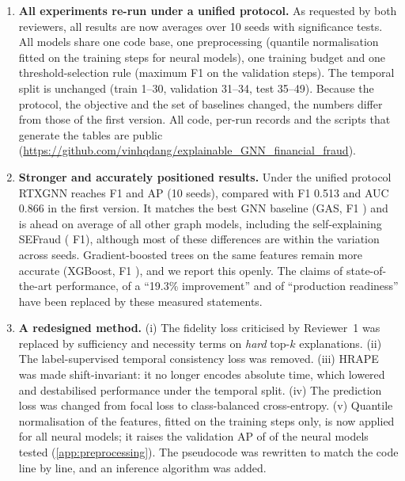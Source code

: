 \documentclass[11pt]{article}
\begin{document}
\begin{enumerate}[leftmargin=*]
\item \textbf{All experiments re-run under a unified protocol.} As requested by both reviewers, all results are now averages over 10 seeds with significance tests. All models share one code base, one preprocessing (quantile normalisation fitted on the training steps for neural models), one training budget and one threshold-selection rule (maximum F1 on the validation steps). The temporal split is unchanged (train 1--30, validation 31--34, test 35--49). Because the protocol, the objective and the set of baselines changed, the numbers differ from those of the first version. All code, per-run records and the scripts that generate the tables are public (\url{https://github.com/vinhqdang/explainable_GNN_financial_fraud}).
\item \textbf{Stronger and accurately positioned results.} Under the unified protocol RTXGNN reaches F1 \rtxFone{} and AP \rtxAP{} (10 seeds), compared with F1 0.513 and AUC 0.866 in the first version. It matches the best GNN baseline (GAS, F1 \gasFone) and is ahead on average of all other graph models, including the self-explaining SEFraud (\deltaFOnesefraud{} F1), although most of these differences are within the variation across seeds. Gradient-boosted trees on the same features remain more accurate (XGBoost, F1 \xgbFone), and we report this openly. The claims of state-of-the-art performance, of a ``19.3\% improvement'' and of ``production readiness'' have been replaced by these measured statements.
\item \textbf{A redesigned method.} (i) The fidelity loss criticised by Reviewer~1 was replaced by sufficiency and necessity terms on \emph{hard} top-$k$ explanations. (ii) The label-supervised temporal consistency loss was removed. (iii) HRAPE was made shift-invariant: it no longer encodes absolute time, which lowered and destabilised performance under the temporal split. (iv) The prediction loss was changed from focal loss to class-balanced cross-entropy. (v) Quantile normalisation of the features, fitted on the training steps only, is now applied for all neural models; it raises the validation AP of \preNvalBetter{} of the \preNmodels{} neural models tested (\ref{app:preprocessing}). The pseudocode was rewritten to match the code line by line, and an inference algorithm was added.

\end{enumerate}
\end{document}
